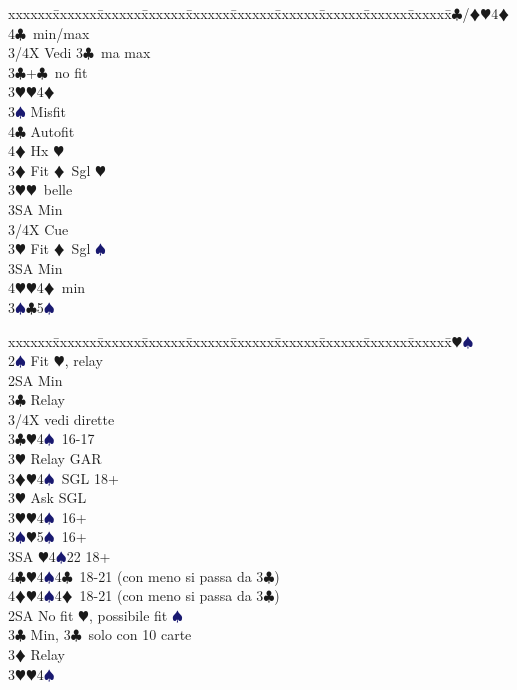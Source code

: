 \documentclass[a4paper,italian]{article}
\newcommand{\BC}{\textcolor{OliveGreen}{$\clubsuit$}}
\newcommand{\BD}{\textcolor{RedOrange}{$\vardiamondsuit$}}
\newcommand{\BH}{\textcolor{Red2}{$\varheartsuit${}}}
\newcommand{\BS}{\textcolor{MidnightBlue}{$\spadesuit${}}}
\newenvironment{bidtable}
{\begin{tabbing}

    xxxxxx\=xxxxxx\=xxxxxx\=xxxxxx\=xxxxxx\=xxxxxx\=xxxxxx\=xxxxxx\=xxxxxx\=xxxxxx\=\kill}
{\end{tabbing} }%
\begin{document}
\begin{multicols}{2}
\begin{bidtable}
        4\BC/\BD {}\BH 4\BD 4\BC\ min/max\-\-\\
        3/4X \> Vedi 3\BC\ ma max\-\\
        3\BC {}+\BC\ no fit\+\\
        3\BH {}\BH 4\BD \+\\
        3\BS \> Misfit\\
        4\BC \> Autofit\\
        4\BD \> Hx \BH \-\-\\
        3\BD \> Fit \BD\ Sgl \BH \+\\
        3\BH {}\BH\ belle\\
        3SA \> Min\\
        3/4X \> Cue\-\\
        3\BH \> Fit \BD\ Sgl \BS \+\\
        3SA \> Min\\
        4\BH {}\BH 4\BD\ min\-\\
        3\BS {}\BC 5\BS \-\\
    \end{bidtable}
    \columnbreak
    \begin{bidtable}
        2\BH {}\BS \+\\
        2\BS \> Fit \BH , relay\+\\
        2SA \> Min\+\\
        3\BC \> Relay\+\\
        3/4X \> vedi dirette\-\-\\
        3\BC {}\BH 4\BS\ 16-17\+\\
        3\BH \> Relay GAR\-\\
        3\BD {}\BH 4\BS\ SGL 18+\+\\
        3\BH \> Ask SGL\-\\
        3\BH {}\BH 4\BS\ 16+\\
        3\BS {}\BH 5\BS\ 16+\\
        3SA \BH 4\BS 22 18+\\
        4\BC {}\BH 4\BS 4\BC\ 18-21 (con meno si passa da 3\BC )\\
        4\BD {}\BH 4\BS 4\BD\ 18-21 (con meno si passa da 3\BC )\-\\
        2SA \> No fit \BH , possibile fit \BS\+\\
        3\BC \> Min, 3\BC\ solo con 10 carte\+\\
        3\BD \> Relay\+\\
        3\BH {}\BH 4\BS \\

\end{bidtable}
\end{multicols}
\end{document}
